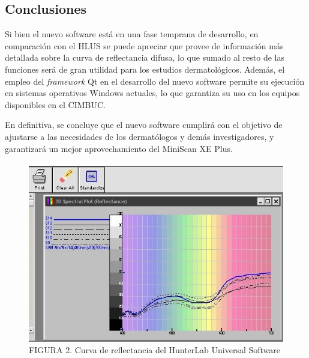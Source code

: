 \documentclass[conference]{IEEEtran}
\begin{document}
	\subsection{Conclusiones}
	Si bien el nuevo software est\'{a} en una fase temprana de desarrollo, en comparaci\'{o}n con el HLUS se puede apreciar que provee de informaci\'{o}n m\'{a}s detallada sobre la curva de reflectancia difusa, lo que sumado al resto de las funciones ser\'{a} de gran utilidad para los estudios dermatol\'{o}gicos. Adem\'{a}s, el empleo del \textit{framework} Qt en el desarrollo del nuevo software permite su ejecuci\'{o}n en sistemas operativos Windows actuales, lo que garantiza su uso en los equipos disponibles en el CIMBUC.

	En definitiva, se concluye que el nuevo software cumplir\'{a} con el objetivo de ajustarse a las necesidades de los dermat\'{o}logos y dem\'{a}s investigadores, y garantizar\'{a} un mejor aprovechamiento del MiniScan XE Plus.

		\begin{figure}[H]
			\centering
			\label{figura_2}
			\includegraphics[scale=0.58]{img/HunterLabSoftware}
			\caption{FIGURA 2. Curva de reflectancia del HunterLab Universal Software}
		\end{figure}
	
\end{document}
